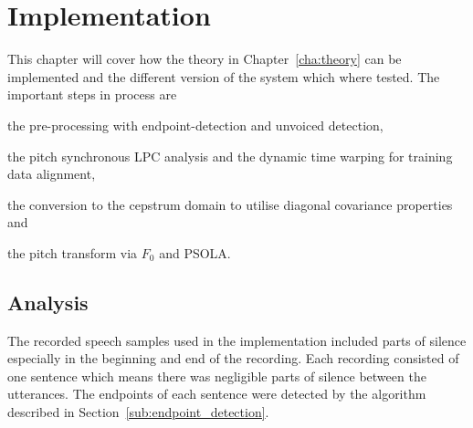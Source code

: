 \chapter{Implementation} %
\label{cha:implementation}
This chapter will cover how the theory in Chapter~\ref{cha:theory} can be implemented and the different version of the system which where tested. The important steps in process are \begin{inparaenum}  \item the pre-processing with endpoint-detection and unvoiced detection, \item the pitch synchronous LPC analysis and the dynamic time warping for training data alignment, \item the conversion to the cepstrum domain to utilise diagonal covariance properties and \item the pitch transform via $F_0$ and PSOLA. \end{inparaenum}


\section{Analysis} %
\label{sec:analysis}
The recorded speech samples used in the implementation included parts of silence especially in the beginning and end of the recording. Each recording consisted of one sentence which means there was negligible parts of silence between the utterances. The endpoints of each sentence were detected by the algorithm described in Section~\ref{sub:endpoint_detection}.

